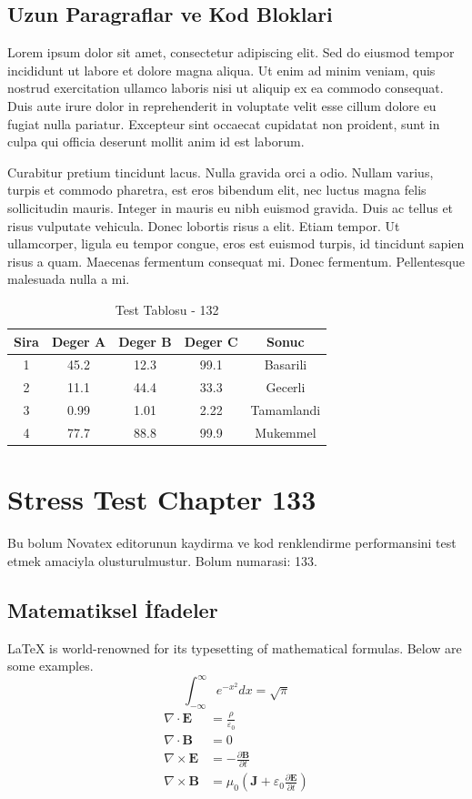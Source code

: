 \documentclass[12pt,a4paper]{article}
\begin{document}
\subsection{Uzun Paragraflar ve Kod Bloklari}
Lorem ipsum dolor sit amet, consectetur adipiscing elit. Sed do eiusmod tempor incididunt ut labore et dolore magna aliqua. Ut enim ad minim veniam, quis nostrud exercitation ullamco laboris nisi ut aliquip ex ea commodo consequat. Duis aute irure dolor in reprehenderit in voluptate velit esse cillum dolore eu fugiat nulla pariatur. Excepteur sint occaecat cupidatat non proident, sunt in culpa qui officia deserunt mollit anim id est laborum.

Curabitur pretium tincidunt lacus. Nulla gravida orci a odio. Nullam varius, turpis et commodo pharetra, est eros bibendum elit, nec luctus magna felis sollicitudin mauris. Integer in mauris eu nibh euismod gravida. Duis ac tellus et risus vulputate vehicula. Donec lobortis risus a elit. Etiam tempor. Ut ullamcorper, ligula eu tempor congue, eros est euismod turpis, id tincidunt sapien risus a quam. Maecenas fermentum consequat mi. Donec fermentum. Pellentesque malesuada nulla a mi.

\begin{table}[h!]
\centering
\begin{tabular}{|c|c|c|c|c|}
\hline
\textbf{Sira} & \textbf{Deger A} & \textbf{Deger B} & \textbf{Deger C} & \textbf{Sonuc} \\
\hline
1 & 45.2 & 12.3 & 99.1 & Basarili \\
2 & 11.1 & 44.4 & 33.3 & Gecerli \\
3 & 0.99 & 1.01 & 2.22 & Tamamlandi \\
4 & 77.7 & 88.8 & 99.9 & Mukemmel \\
\hline
\end{tabular}
\caption{Test Tablosu - 132}
\end{table}

\newpage
\section{Stress Test Chapter 133}
Bu bolum Novatex editorunun kaydirma ve kod renklendirme performansini test etmek amaciyla olusturulmustur. Bolum numarasi: 133.

\subsection{Matematiksel İfadeler}
\LaTeX{} is world-renowned for its typesetting of mathematical formulas. Below are some examples.
\begin{equation}
\int_{-\infty}^{\infty} e^{-x^2} dx = \sqrt{\pi}
\end{equation}
\begin{align}
\nabla \cdot \mathbf{E} &= \frac{\rho}{\varepsilon_0} \\
\nabla \cdot \mathbf{B} &= 0 \\
\nabla \times \mathbf{E} &= -\frac{\partial \mathbf{B}}{\partial t} \\
\nabla \times \mathbf{B} &= \mu_0\left(\mathbf{J} + \varepsilon_0 \frac{\partial \mathbf{E}}{\partial t}\right)
\end{align}
\end{document}
